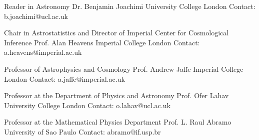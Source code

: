 

\begin{cventries}

  \cventry
    {Reader in Astronomy} %
    {Dr. Benjamin Joachimi} %
    {University College London} %
    {} %
    {
      Contact: {b.joachimi@ucl.ac.uk}
    }
    
%
  \cventry
    {Chair in Astrostatistics and Director of Imperial Center for Cosmological Inference} %
    {Prof. Alan Heavens} %
    {Imperial College London} %
    {} %
    {
      Contact: {a.heavens@imperial.ac.uk}
    }
    
  \cventry
    {Professor of Astrophysics and Cosmology} %
    {Prof. Andrew Jaffe} %
    {Imperial College London} %
    {} %
    {
      Contact: {a.jaffe@imperial.ac.uk}
    }

  \cventry
    {Professor at the Department of Physics and Astronomy} %
    {Prof. Ofer Lahav} %
    {University College London} %
    {} %
    {
      Contact: {o.lahav@ucl.ac.uk}
    }

  \cventry
    {Professor at the Mathematical Physics Department} %
    {Prof. L. Raul Abramo} %
    {University of Sao Paulo} %
    {} %
    {
     Contact: abramo@if.usp.br 
     }

\end{cventries}